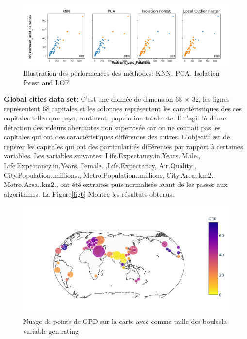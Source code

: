  \begin{figure}[ht]
    \centering
    \includegraphics[width=1\textwidth]{ADOA/Images/fatalall.png}
    \caption{Illustration des performences des méthodes: KNN, PCA, Isolation forest and LOF}%
    \label{fig3}
\end{figure}
\vspace{2cm}

\textbf{Global cities data set:} 
 C’est une donnée de dimension 68 $\times$ 32, les lignes représentent  68 capitales  et les colonnes représentent les caractéristiques  des ces capitales telles que pays, continent, population totale etc.   Il s’agit là d’une détection des valeurs aberrantes non supervisée car on ne connait pas les capitales qui ont des caractéristiques différentes des autres. L’objectif est de repérer les capitales qui ont des particularités différentes par rapport à certaines variables. Les variables suivantes:  Life.Expectancy.in.Years..Male., Life.Expectancy.in.Years..Female. ,Life.Expectancy, Air.Quality., City.Population..millions., Metro.Population..millions, City.Area..km2., Metro.Area..km2., ont été extraites puis normalisée avant de les passer aux algorithmes. La Figure\ref{fig6} Montre les résultats obtenus.
\begin{figure}[ht]
    \centering
\includegraphics[width=1\textwidth]{ADOA/Images/Globbpng.png}
    \caption{Nuage de points de GPD sur la carte avec comme taille des boulesla variable gen.rating }%
    \label{fig4}
\end{figure}

